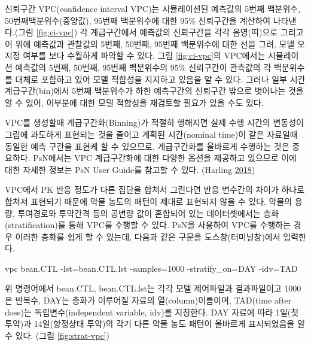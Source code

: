 \documentclass[
  10pt,
  krantz2,
  a4paper]{krantz}
\newenvironment{Shaded}{\begin{snugshade}}{\end{snugshade}}
\newcommand{\ExtensionTok}[1]{#1}
\newcommand{\NormalTok}[1]{#1}
\theoremstyle{definition}
\theoremstyle{definition}
\theoremstyle{definition}
\theoremstyle{remark}
\begin{document}
신뢰구간 VPC(confidence interval VPC)는 시뮬레이션된 예측값의 5번째 백분위수, 50번째백분위수(중앙값), 95번째 백분위수에 대한 95\% 신뢰구간을 계산하여 나타낸다.(그림 \ref{fig:ci-vpc}) 각 계급구간에서 예측값의 신뢰구간을 각각 음영(띠)으로 그리고 이 위에 예측값과 관찰값의 5번째, 50번째, 95번째 백분위수에 대한 선을 그려, 모델 오지정 여부를 보다 수월하게 파악할 수 있다. 그림 \ref{fig:ci-vpc}의 VPC에서는 시뮬레이션 예측값의 5번째, 50번째, 95번째 백분위수의 95\% 신뢰구간이 관측값의 각 백분위수를 대체로 포함하고 있어 모델 적합성을 지지하고 있음을 알 수 있다. 그러나 일부 시간 계급구간(bin)에서 5번째 백분위수가 하한 예측구간의 신뢰구간 밖으로 벗어나는 것을 알 수 있어, 이부분에 대한 모델 적합성을 재검토할 필요가 있을 수도 있다.


VPC를 생성할때 계급구간화(Binning)가 적절히 행해지면 실제 수행 시간의 변동성이 그림에 과도하게 표현되는 것을 줄이고 계획된 시간(nominal time)이 같은 자료일때 동일한 예측 구간을 표현케 할 수 있으므로, 계급구간화를 올바르게 수행하는 것은 중요하다. PsN에서는 VPC 계급구간화에 대한 다양한 옵션을 제공하고 있으므로 이에 대한 자세한 정보는 PsN User Guide를 참고할 수 있다. (Harling \protect\hyperlink{ref-vpcnpc}{2018})


VPC에서 PK 반응 정도가 다른 집단을 합쳐서 그린다면 반응 변수간의 차이가 하나로 합쳐져 표현되기 때문에 약물 농도의 패턴이 제대로 표현되지 않을 수 있다. 약물의 용량, 투여경로와 투약간격 등의 공변량 값이 혼합되어 있는 데이터셋에서는 층화(stratification)를 통해 VPC를 수행할 수 있다. PsN을 사용하여 VPC를 수행하는 경우 이러한 층화를 쉽게 할 수 있는데, 다음과 같은 구문을 도스창(터미널창)에서 입력한다.

\begin{Shaded}
\begin{Highlighting}[]
\ExtensionTok{vpc}\NormalTok{ bean.CTL {-}lst=bean.CTL.lst {-}samples=1000 {-}stratify\_on=DAY {-}idv=TAD}
\end{Highlighting}
\end{Shaded}

위 명령어에서 bean.CTL, bean.CTL.lst는 각각 모델 제어파일과 결과파일이고 1000은 반복수, DAY는 층화가 이루어질 자료의 열(column)이름이며, TAD(time after dose)는 독립변수(independent variable, idv)를 지칭한다. DAY 자료에 따라 1일(첫 투약)과 14일(항정상태 투약)의 각기 다른 약물 농도 패턴이 올바르게 표시되었음을 알 수 있다. (그림 \ref{fig:strat-vpc})
\end{document}
